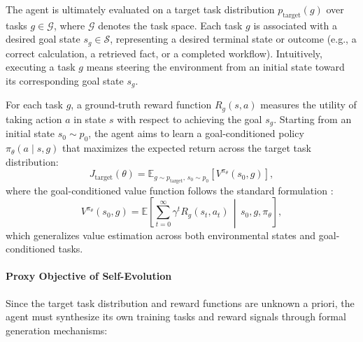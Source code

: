 The agent is ultimately evaluated on a target task distribution $p_{\text{target}}(g)$ over tasks $g \in \mathcal{G}$, where $\mathcal{G}$ denotes the task space. Each task $g$ is associated with a desired goal state $s_g \in \mathcal{S}$, representing a desired terminal state or outcome (e.g., a correct calculation, a retrieved fact, or a completed workflow). Intuitively, executing a task $g$ means steering the environment from an initial state toward its corresponding goal state $s_g$.

For each task $g$, a ground-truth reward function $R_g(s, a)$ measures the utility of taking action $a$ in state $s$ with respect to achieving the goal $s_g$. Starting from an initial state $s_0 \sim p_0$, the agent aims to learn a goal-conditioned policy $\pi_\theta(a \mid s, g)$ that maximizes the expected return across the target task distribution:
\begin{equation}
\label{eq:target_objective}
J_{\text{target}}(\theta) = 
\mathbb{E}_{g \sim p_{\text{target}},\, s_0 \sim p_0}
\left[ 
V^{\pi_\theta}(s_0, g)
\right],
\end{equation}
where the goal-conditioned value function follows the standard formulation \citep{schaul2015universal, liu2022goal}:
\begin{equation}
\label{eq:value_function}
V^{\pi_\theta}(s_0, g) 
= 
\mathbb{E} 
\left[ 
\sum_{t=0}^{\infty} \gamma^t R_g(s_t, a_t) 
\,\middle|\, 
s_0, g, \pi_\theta 
\right],
\end{equation}
which generalizes value estimation across both environmental states and goal-conditioned tasks.


\paragraph{Proxy Objective of Self-Evolution}
Since the target task distribution and reward functions are unknown a priori, the agent must synthesize its own training tasks and reward signals through formal generation mechanisms:

